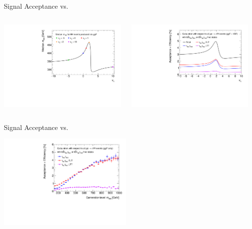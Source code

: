 \documentclass[11pt, xcolor={dvipsnames}, aspectratio=169]{beamer}
\begin{document}
\begin{frame}{Signal Acceptance vs.\ \allbold{\klambda}}
  \begin{columns}
    \includegraphics[width=\textwidth]{self_coupling/hh_median_mhh_vs_klam}\hfill%

    \includegraphics[width=\textwidth]{self_coupling/acc_vs_klam}
  \end{columns}
\end{frame}


\begin{frame}{Signal Acceptance vs.\ \allbold{\mHH}}
  \begin{center}
    \includegraphics[width=0.5\textwidth]{self_coupling/acc_vs_mhh}
  \end{center}
\end{frame}
\end{document}
